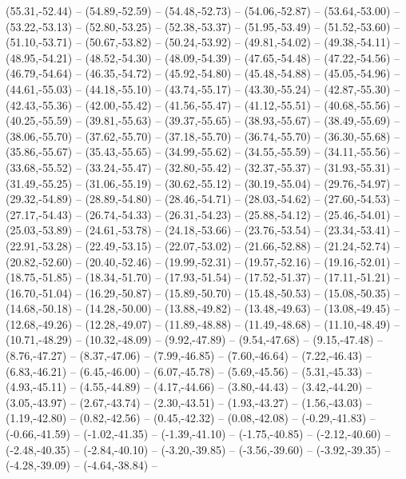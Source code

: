 {  (55.31,-52.44) -- (54.89,-52.59) -- (54.48,-52.73) -- (54.06,-52.87) -- (53.64,-53.00) -- (53.22,-53.13) -- (52.80,-53.25) --
  (52.38,-53.37) -- (51.95,-53.49) -- (51.52,-53.60) -- (51.10,-53.71) -- (50.67,-53.82) -- (50.24,-53.92) -- (49.81,-54.02) --
  (49.38,-54.11) -- (48.95,-54.21) -- (48.52,-54.30) -- (48.09,-54.39) -- (47.65,-54.48) -- (47.22,-54.56) -- (46.79,-54.64) --
  (46.35,-54.72) -- (45.92,-54.80) -- (45.48,-54.88) -- (45.05,-54.96) -- (44.61,-55.03) -- (44.18,-55.10) -- (43.74,-55.17) --
  (43.30,-55.24) -- (42.87,-55.30) -- (42.43,-55.36) -- (42.00,-55.42) -- (41.56,-55.47) -- (41.12,-55.51) -- (40.68,-55.56) --
  (40.25,-55.59) -- (39.81,-55.63) -- (39.37,-55.65) -- (38.93,-55.67) -- (38.49,-55.69) -- (38.06,-55.70) -- (37.62,-55.70) --
  (37.18,-55.70) -- (36.74,-55.70) -- (36.30,-55.68) -- (35.86,-55.67) -- (35.43,-55.65) -- (34.99,-55.62) -- (34.55,-55.59) --
  (34.11,-55.56) -- (33.68,-55.52) -- (33.24,-55.47) -- (32.80,-55.42) -- (32.37,-55.37) -- (31.93,-55.31) -- (31.49,-55.25) --
  (31.06,-55.19) -- (30.62,-55.12) -- (30.19,-55.04) -- (29.76,-54.97) -- (29.32,-54.89) -- (28.89,-54.80) -- (28.46,-54.71) --
  (28.03,-54.62) -- (27.60,-54.53) -- (27.17,-54.43) -- (26.74,-54.33) -- (26.31,-54.23) -- (25.88,-54.12) -- (25.46,-54.01) --
  (25.03,-53.89) -- (24.61,-53.78) -- (24.18,-53.66) -- (23.76,-53.54) -- (23.34,-53.41) -- (22.91,-53.28) -- (22.49,-53.15) --
  (22.07,-53.02) -- (21.66,-52.88) -- (21.24,-52.74) -- (20.82,-52.60) -- (20.40,-52.46) -- (19.99,-52.31) -- (19.57,-52.16) --
  (19.16,-52.01) -- (18.75,-51.85) -- (18.34,-51.70) -- (17.93,-51.54) -- (17.52,-51.37) -- (17.11,-51.21) -- (16.70,-51.04) --
  (16.29,-50.87) -- (15.89,-50.70) -- (15.48,-50.53) -- (15.08,-50.35) -- (14.68,-50.18) -- (14.28,-50.00) -- (13.88,-49.82) --
  (13.48,-49.63) -- (13.08,-49.45) -- (12.68,-49.26) -- (12.28,-49.07) -- (11.89,-48.88) -- (11.49,-48.68) -- (11.10,-48.49) --
  (10.71,-48.29) -- (10.32,-48.09) -- (9.92,-47.89) -- (9.54,-47.68) -- (9.15,-47.48) -- (8.76,-47.27) -- (8.37,-47.06) --
  (7.99,-46.85) -- (7.60,-46.64) -- (7.22,-46.43) -- (6.83,-46.21) -- (6.45,-46.00) -- (6.07,-45.78) -- (5.69,-45.56) --
  (5.31,-45.33) -- (4.93,-45.11) -- (4.55,-44.89) -- (4.17,-44.66) -- (3.80,-44.43) -- (3.42,-44.20) -- (3.05,-43.97) --
  (2.67,-43.74) -- (2.30,-43.51) -- (1.93,-43.27) -- (1.56,-43.03) -- (1.19,-42.80) -- (0.82,-42.56) -- (0.45,-42.32) --
  (0.08,-42.08) -- (-0.29,-41.83) -- (-0.66,-41.59) -- (-1.02,-41.35) -- (-1.39,-41.10) -- (-1.75,-40.85) -- (-2.12,-40.60) --
  (-2.48,-40.35) -- (-2.84,-40.10) -- (-3.20,-39.85) -- (-3.56,-39.60) -- (-3.92,-39.35) -- (-4.28,-39.09) -- (-4.64,-38.84) --
}
